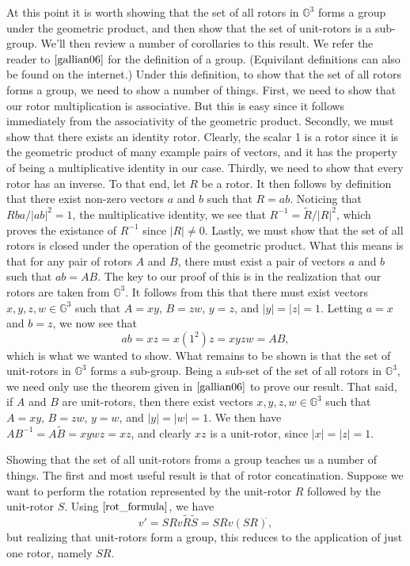 \documentclass{article}
\newcommand{\G}{\mathbb{G}}
\begin{document}
At this point it is worth showing that the set of all rotors in
$\G^3$ forms a group under the geometric product, and then show
that the set of unit-rotors is a sub-group.  We'll then review a
number of corollaries to this result.  We refer the reader to $\cite[p. 43]{gallian06}$
for the definition of a group.  (Equivilant definitions can also
be found on the internet.)  Under this definition, to show that
the set of all rotors forms a group, we need to show a number of things.
First, we need to show that our rotor multiplication is associative.
But this is easy since it follows immediately from the associativity of
the geometric product.  Secondly, we must show that there exists an
identity rotor.  Clearly, the scalar 1 is a rotor since it is the
geometric product of many example pairs of vectors, and it has the
property of being a multiplicative identity in our case.
Thirdly, we need to show that every rotor has an inverse.
To that end, let $R$ be a rotor.  It then follows by definition that
there exist non-zero vectors $a$ and $b$ such that $R=ab$.
Noticing that $Rba/|ab|^2=1$, the multiplicative identity, we see that
$R^{-1}=\tilde{R}/|R|^2$, which proves the existance of $R^{-1}$
since $|R|\neq 0$.  Lastly, we must show that the set of all
rotors is closed under the operation of the geometric product.
What this means is that for any pair of
rotors $A$ and $B$, there must exist a pair of vectors $a$ and $b$
such that $ab=AB$.  The key to our proof of this is in the realization
that our rotors are taken from $\G^3$.  It follows from this that
there must exist vectors $x,y,z,w\in\G^3$ such that $A=xy$,
$B=zw$, $y=z$, and $|y|=|z|=1$.  Letting $a=x$ and $b=z$,
we now see that
\begin{equation*}
ab = xz = x(1^2)z = xyzw = AB,
\end{equation*}
which is what we wanted to show.  What remains to be shown
is that the set of unit-rotors in $\G^3$ forms a sub-group.  Being
a sub-set of the set of all rotors in $\G^3$, we need only use
the theorem given in $\cite[p. 61]{gallian06}$ to prove our result.
That said, if $A$ and $B$ are unit-rotors, then there exist
vectors $x,y,z,w\in\G^3$ such that $A=xy$, $B=zw$, $y=w$, and $|y|=|w|=1$.
We then have $AB^{-1}=A\tilde{B}=xywz=xz$, and clearly $xz$
is a unit-rotor, since $|x|=|z|=1$.

Showing that the set of all unit-rotors froms a group teaches us
a number of things.  The first and most useful result is that
of rotor concatination.  Suppose we want to perform the rotation
represented by the unit-rotor $R$ followed by the unit-rotor $S$.
Using $\eqref{rot_formula}$, we have
\begin{equation*}
v' = SRv\tilde{R}\tilde{S} = SRv(SR)^{\tilde{}},
\end{equation*}
but realizing that unit-rotors form a group, this reduces to the application
of just one rotor, namely $SR$.
\end{document}
